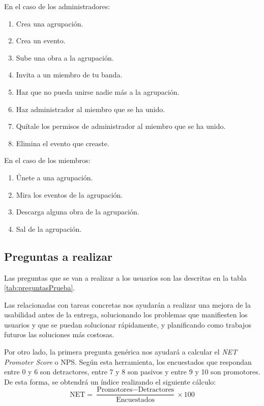 En el caso de los administradores:

\begin{enumerate}
    \item Crea una agrupación.
    \item Crea un evento.
    \item Sube una obra a la agrupación.
    \item Invita a un miembro de tu banda.
    \item Haz que no pueda unirse nadie más a la agrupación.
    \item Haz administrador al miembro que se ha unido.
    \item Quítale los permisos de administrador al miembro que se ha unido.
    \item Elimina el evento que creaste.
\end{enumerate}

En el caso de los miembros:

\begin{enumerate}
    \item Únete a una agrupación.
    \item Mira los eventos de la agrupación.
    \item Descarga alguna obra de la agrupación.
    \item Sal de la agrupación.
\end{enumerate}


\subsection{Preguntas a realizar}

Las preguntas que se van a realizar a los usuarios son las descritas en la tabla \ref{tab:preguntasPrueba}.

Las relacionadas con tareas concretas nos ayudarán a realizar una mejora de la usabilidad antes de la entrega, solucionando los problemas que manifiesten los usuarios y que se puedan solucionar rápidamente, y planificando como trabajos futuros las soluciones más costosas.

Por otro lado, la primera pregunta genérica nos ayudará a calcular el \textit{NET Promoter Score} o NPS. Según esta herramienta, los encuestados que respondan entre 0 y 6 son detractores, entre 7 y 8 son pasivos y entre 9 y 10 son promotores. De esta forma, se obtendrá un índice realizando el siguiente cálculo:
\[
\textrm{NET} = \frac{\textrm{Promotores} - \textrm{Detractores}}{\textrm{Encuestados}} \times 100
\]

